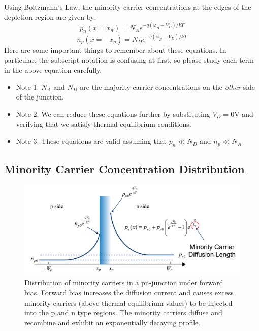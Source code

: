 Using Boltzmann's Law, the minority carrier concentrations at the edges of the depletion region are given by:
%
\begin{equation} 
	{p_n}(x = {x_n}) = {N_A}{e^{ - q({\varphi _B} - {V_D})/kT}}
\end{equation}
%
\begin{equation} 
	{n_p}(x =  - {x_p}) = {N_D}{e^{ - q({\varphi _B} - {V_D})/kT}}
\end{equation}
%
Here are some important things to remember about these equations.  In particular, the subscript notation is confusing at first, so please study each term in the above equation carefully.
\begin{itemize}
	\item Note 1: $N_A$ and $N_D$ are the majority carrier concentrations on the \textit{other} side of the junction.
	
	\item  Note 2: We can reduce these equations further by substituting
$V_D = 0$V and verifying that we satisfy thermal equilibrium conditions.

	\item  Note 3:  These equations are valid assuming that $p_n \ll N_D$ and $n_p \ll N_A$
 \end{itemize}
 


\subsection{Minority Carrier Concentration Distribution}

\begin{figure}[tb]
\begin{center}
\includegraphics[width=.75\columnwidth]{slide41}
\end{center}
\caption{Distribution of minority carriers in a pn-junction under forward bias.  Forward bias increases the diffusion current and causes excess minority carriers (above thermal equilibrium values) to be injected into the p and n type regions.  The minority carriers diffuse and recombine and exhibit an exponentially decaying profile. } \label{fig:slide41}
\end{figure}

